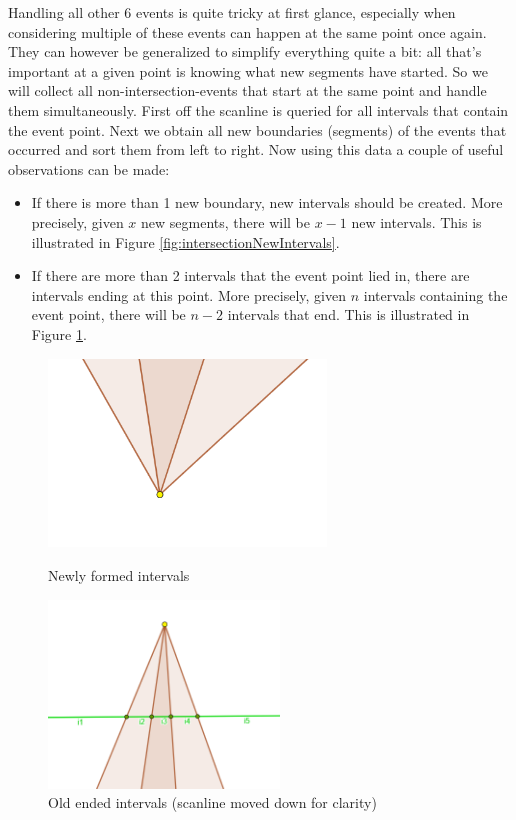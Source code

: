 \documentclass[12pt]{article}
\begin{document}
Handling all other 6 events is quite tricky at first glance, especially when considering multiple of these events can happen at the same point once again. They can however be generalized to simplify everything quite a bit: all that's important at a given point is knowing what new segments have started. So we will collect all non-intersection-events that start at the same point and handle them simultaneously. First off the scanline is queried for all intervals that contain the event point. Next we obtain all new boundaries (segments) of the events that occurred and sort them from left to right. Now using this data a couple of useful observations can be made: \begin{itemize}
    \item If there is more than 1 new boundary, new intervals should be created. More precisely, given $x$ new segments, there will be $x-1$ new intervals. This is illustrated in Figure \ref{fig:intersectionNewIntervals}.
    \item If there are more than 2 intervals that the event point lied in, there are intervals ending at this point. More precisely, given $n$ intervals containing the event point, there will be $n-2$ intervals that end. This is illustrated in Figure \ref{fig:intersectionOldIntervals}.
\end{itemize}

\begin{figure}[H]
    \centering
    \includegraphics[height=5cm]{Images/intersection_newIntervals.png}
    \caption{Newly formed intervals}
    \label{fig:intersectionNewIntervals}
    \endminipage\hfill
    \centering
    \includegraphics[height=5cm]{Images/intersection_oldIntervals.png}
    \caption{Old ended intervals (scanline moved down for clarity)}
    \label{fig:intersectionOldIntervals}
    \endminipage
\end{figure}
\end{document}
